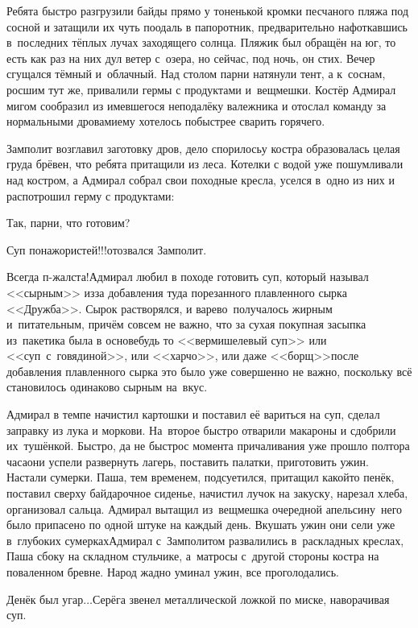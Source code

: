 Ребята быстро разгрузили байды прямо у тоненькой кромки песчаного пляжа под сосной и затащили их чуть поодаль в папоротник, предварительно нафоткавшись в~последних тёплых лучах заходящего солнца. Пляжик был обращён на юг, то есть как раз на них дул ветер с~озера, но сейчас, под ночь, он стих. Вечер сгущался тёмный и~облачный. Над столом парни натянули тент, а к~соснам, росшим тут же, привалили гермы с продуктами и~вещмешки. Костёр Адмирал мигом сообразил из имевшегося неподалёку валежника и отослал команду за нормальными дровами\mdash ему хотелось побыстрее сварить горячего.

Замполит возглавил заготовку дров, дело спорилось\mdash у костра образовалась целая груда брёвен, что ребята притащили из леса. Котелки с водой уже пошумливали над костром, а Адмирал собрал свои походные кресла, уселся в~одно из них и распотрошил герму с продуктами:

\diagdash Так, парни, что готовим?

\diagdash Суп понажористей!!!\mdash отозвался Замполит.

\diagdash Всегда п-жалста!\mdash Адмирал любил в походе готовить суп, который называл <<сырным>> из\sdash за добавления туда порезанного плавленного сырка <<Дружба>>. Сырок растворялся, и варево~получалось жирным и~питательным, причём совсем не важно, что за сухая покупная засыпка из~пакетика была в основе\mdash будь то <<вермишелевый суп>> или <<суп~с~говядиной>>, или <<харчо>>, или даже <<борщ>>\mdash после добавления плавленного сырка это было уже совершенно не важно, поскольку всё становилось одинаково сырным на~вкус.

Адмирал в темпе начистил картошки и поставил её вариться на суп, сделал заправку из лука и моркови. На~второе быстро отварили макароны и сдобрили их~тушёнкой. Быстро, да не быстро\mdash с момента причаливания уже прошло полтора часа\mdash они успели развернуть лагерь, поставить палатки, приготовить ужин. Настали сумерки. Паша, тем временем, подсуетился, притащил какой\sdash то пенёк, поставил сверху байдарочное сиденье, начистил лучок на закуску, нарезал хлеба, организовал сальца. Адмирал вытащил из~вещмешка очередной апельсин\mdash у~него было припасено по одной штуке на каждый день. Вкушать ужин они сели уже в~глубоких сумерках\mdash Адмирал с~Замполитом развалились в~раскладных креслах, Паша сбоку на складном стульчике, а~матросы с~другой стороны костра на поваленном бревне. Народ жадно уминал ужин, все проголодались.

\diagdash Денёк был угар$\ldots$\mdash Серёга звенел металлической ложкой по миске, наворачивая суп.%


